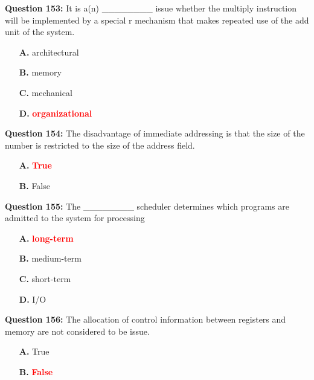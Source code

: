 \documentclass[12pt,a4paper]{article}
\begin{document}
\vspace{0.5cm}

\textbf{Question 153:} It is a(n) ________ issue whether the multiply instruction will be implemented by a special r mechanism that makes repeated use of the add unit of the system.

\begin{itemize}
    \item[\textbf{A.}] architectural
    \item[\textbf{B.}] memory
    \item[\textbf{C.}] mechanical
    \item[\textbf{D.}] \textcolor{red}{\textbf{organizational}}
\end{itemize}

\vspace{0.5cm}

\textbf{Question 154:} The disadvantage of immediate addressing is that the size of the number is restricted to the size of the address field.

\begin{itemize}
    \item[\textbf{A.}] \textcolor{red}{\textbf{True}}
    \item[\textbf{B.}] False
\end{itemize}

\vspace{0.5cm}

\textbf{Question 155:} The ________ scheduler determines which programs are admitted to the system for processing

\begin{itemize}
    \item[\textbf{A.}] \textcolor{red}{\textbf{long-term}}
    \item[\textbf{B.}] medium-term
    \item[\textbf{C.}] short-term
    \item[\textbf{D.}] I/O
\end{itemize}

\vspace{0.5cm}

\textbf{Question 156:} The allocation of control information between registers and memory are not considered to be issue.

\begin{itemize}
    \item[\textbf{A.}] True
    \item[\textbf{B.}] \textcolor{red}{\textbf{False}}
\end{itemize}
\end{document}
